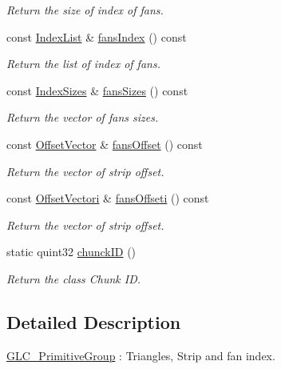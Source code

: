 \begin{DoxyCompactItemize}
\begin{DoxyCompactList}\small\item\em Return the size of index of fans. \end{DoxyCompactList}\item 
const \hyperlink{glc__global_8h_a92568854751d0cfbc27eae9c76aab7cf}{Index\-List} \& \hyperlink{class_g_l_c___primitive_group_a4cf0c01013ccf4328a6572e1e401cd6d}{fans\-Index} () const 
\begin{DoxyCompactList}\small\item\em Return the list of index of fans. \end{DoxyCompactList}\item 
const \hyperlink{glc__global_8h_ad0cd3186041d4811de0ebb6ea411fd82}{Index\-Sizes} \& \hyperlink{class_g_l_c___primitive_group_ac872894621327ece23b18ebe71e8697d}{fans\-Sizes} () const 
\begin{DoxyCompactList}\small\item\em Return the vector of fans sizes. \end{DoxyCompactList}\item 
const \hyperlink{glc__global_8h_a3edb58ebf0cc44d83eec31a509175651}{Offset\-Vector} \& \hyperlink{class_g_l_c___primitive_group_ac6474208057c0734984e5720a864c625}{fans\-Offset} () const 
\begin{DoxyCompactList}\small\item\em Return the vector of strip offset. \end{DoxyCompactList}\item 
const \hyperlink{glc__global_8h_a023e9bc3950160925c44bfc2f093f25b}{Offset\-Vectori} \& \hyperlink{class_g_l_c___primitive_group_a7b7951d2f75945e50187f7d8b49f2b3d}{fans\-Offseti} () const 
\begin{DoxyCompactList}\small\item\em Return the vector of strip offset. \end{DoxyCompactList}\item 
static quint32 \hyperlink{class_g_l_c___primitive_group_a4bfc729578e925562442a2f45ea03ae4}{chunck\-I\-D} ()
\begin{DoxyCompactList}\small\item\em Return the class Chunk I\-D. \end{DoxyCompactList}\end{DoxyCompactItemize}


\subsection{Detailed Description}
\hyperlink{class_g_l_c___primitive_group}{G\-L\-C\-\_\-\-Primitive\-Group} \-: Triangles, Strip and fan index. 

